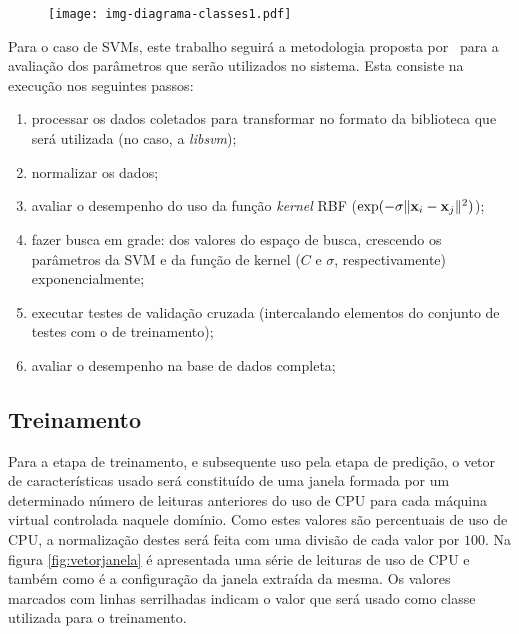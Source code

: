 \begin{figure}[htp]
\centering
\texttt{[image: img-diagrama-classes1.pdf]}
\label{fig:diagramaclasses1}
\end{figure}


Para o caso de SVMs, este trabalho seguirá a metodologia proposta
por~ para a avaliação dos parâmetros que serão
utilizados no sistema. Esta consiste na execução nos seguintes passos:
\begin{enumerate}
  \item processar os dados coletados para transformar no formato da biblioteca
        que será utilizada (no caso, a \emph{libsvm});
  \item normalizar os dados;
  \item avaliar o desempenho do uso da função \emph{kernel} RBF
        ($\exp(-\sigma\lVert \mathbf{x}_i-\mathbf{x}_j \rVert^2)$);
  \item fazer busca em grade: dos valores do espaço de busca, crescendo os
	 parâmetros da SVM e da função de kernel ($C$ e $\sigma$,
         respectivamente) exponencialmente;
  \item executar testes de validação cruzada (intercalando elementos do conjunto
        de testes com o de treinamento);
 \item avaliar o desempenho na base de dados completa;
\end{enumerate}

\subsection{Treinamento}

Para a etapa de treinamento, e subsequente uso pela etapa de predição, o
vetor de características usado será constituído de uma janela
formada por um determinado número de leituras anteriores do uso de CPU para
cada máquina virtual controlada naquele domínio. Como estes valores são
percentuais de uso de CPU, a normalização destes será feita com uma divisão
de cada valor por $100$. Na figura \ref{fig:vetorjanela} é apresentada uma
série de leituras de uso de CPU e também como é a configuração da janela
extraída da mesma. Os valores marcados com linhas serrilhadas indicam o valor
que será usado como classe utilizada para o treinamento.

